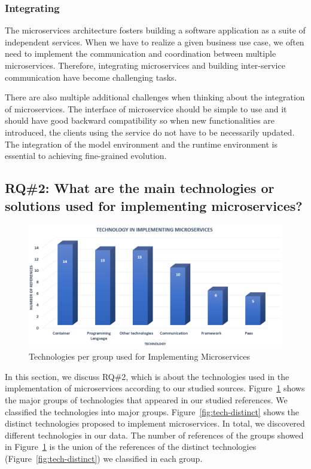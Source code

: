 \subsubsection{Integrating}%

The microservices architecture fosters building a software application as a suite of independent services.\cite{rosa2018} When we have to realize a given business use case, we often need to implement the communication and coordination between multiple microservices. Therefore, integrating microservices and building inter-service communication have become challenging tasks.

There are also multiple additional challenges when thinking about the integration of microservices. The interface of microservice should be simple to use and it should have good backward compatibility so when new functionalities are introduced, the clients using the service do not have to be necessarily updated.\cite{Kalske2017paper, Zhang2019, liu2018} The integration of the model environment and the runtime environment is essential to achieving fine-grained evolution.\cite{overeem2018}




\subsection{RQ\#2: What are the main technologies or solutions used for implementing microservices?}\label{sec:results-rq2}

\begin{figure}[h]
	\centering
	\includegraphics[width=0.75\linewidth]{images/commtechother.png}
	\caption{Technologies per group used for Implementing Microservices}
	\label{fig:tech-group}
\end{figure}	

In this section, we discuss RQ\#2, which is about the technologies used in the implementation of microservices according to our studied sources. Figure~\ref{fig:tech-group} shows the major groups of technologies that appeared in our studied references. We classified the technologies into \techgroupcount major groups.
Figure~\ref{fig:tech-distinct} shows the distinct technologies proposed to implement microservices. In total, we discovered \techcount different technologies in our data. 
The number of references of the groups showed in Figure~\ref{fig:tech-group} is the union of the references of the distinct technologies (Figure~\ref{fig:tech-distinct}) we classified in each group.  

